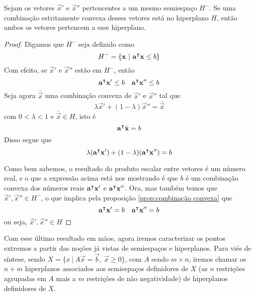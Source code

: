 \begin{prop:hiperplano e ponto extremo}
	\label{prop:hiperplano e ponto extremo}
	Sejam os vetores $\vec{x}'$ e $\vec{x}''$ pertencentes a um mesmo semiespaço $H^-$. Se uma combinação estritamente convexa desses vetores está no hiperplano $H$, então ambos os vetores pertencem a esse hiperplano.
	
	\begin{proof}
		Digamos que $H^-$ seja definido como
		\[H^- = \{\vec{x}\ |\ \transp{a}\vec{x} \leq b\}\]
		Com efeito, se $\vec{x}'$ e $\vec{x}''$ estão em $H^-$, então
		\[\mathbf{a}^\intercal\mathbf{x}' \leq b \quad \mathbf{a}^\intercal\mathbf{x}'' \leq b\]
		Seja agora $\bar{\vec{x}}$ uma combinação convexa de $\vec{x}'$ e $\vec{x}''$ tal que 
		\[\lambda \vec{x}' + (1 - \lambda) \vec{x}'' = \bar{\vec{x}}\]
		com $0 < \lambda < 1$ e $\bar{\vec{x}} \in H$, isto é
		\[\mathbf{a}^\intercal\bar{\mathbf{x}} = b\]
		Disso segue que
		\[\lambda (\mathbf{a}^\intercal\mathbf{x}') + (1 - \lambda) (\mathbf{a}^\intercal\mathbf{x}'') = b\]
		
		Como bem sabemos, o resultado do produto escalar entre vetores é um número real, e o que a expressão acima está nos mostrando é que $b$ é um combinação convexa dos números reais $\mathbf{a}^\intercal\mathbf{x}'$ e $\mathbf{a}^\intercal\mathbf{x}''$. Ora, mas também temos que $\vec{x}', \vec{x}'' \in H^-$, o que implica pela proposição \ref*{prop:combinação convexa} que
		\[\mathbf{a}^\intercal\mathbf{x}' = b \quad \mathbf{a}^\intercal\mathbf{x}'' = b\]ou seja, $\vec{x}', \vec{x}'' \in H$
	\end{proof} 
\end{prop:hiperplano e ponto extremo}

Com esse último resultado em mãos, agora iremos caracterizar os pontos extremos a partir das noções já vistas de semiespaços e hiperplanos. Para viés de síntese, sendo $X = \{x\ |\ A\vec{x} = \vec{b},\ \vec{x} \geq 0\}$, com $A$ sendo $m \times n$, iremos chamar os $n + m$ hiperplanos associados aos semiespaços definidores de $X$ (as $n$ restrições agrupadas em $A$ mais a $m$ restrições de não negatividade) de hiperplanos definidores de $X$.  

